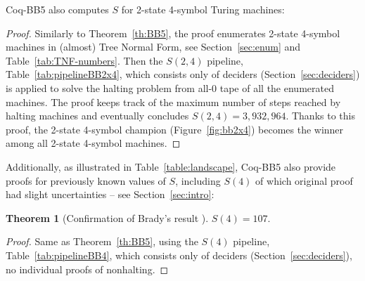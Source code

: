 \documentclass[a4paper,british]{article}
\theoremstyle{definition} %
\newtheorem{theorem}{Theorem}[section]
\numberwithin{equation}{section}
\theoremstyle{definition} %
\newcommand{\BBtheFourth}{107}
\newcommand{\BBTxF}{3{,}932{,}964}
\newcommand{\CoqBB}{Coq-BB5\xspace}
\begin{document}
\CoqBB also computes $S$ for 2-state 4-symbol Turing machines:

\thBBTxF*

\begin{proof}
    Similarly to Theorem~\ref{th:BB5}, the \Coq proof enumerates 2-state 4-symbol machines in (almost) Tree Normal Form, see Section~\ref{sec:enum} and Table~\ref{tab:TNF-numbers}. Then the $S(2,4)$ pipeline, Table~\ref{tab:pipelineBB2x4}, which consists only of deciders (Section~\ref{sec:deciders}) is applied to solve the halting problem from all-0 tape of all the enumerated machines. The proof keeps track of the maximum number of steps reached by halting machines and eventually concludes $S(2,4) = \BBTxF$. Thanks to this proof, the 2-state 4-symbol champion (Figure~\ref{fig:bb2x4}) becomes the winner among all 2-state 4-symbol machines.
\end{proof}

Additionally, as illustrated in Table~\ref{table:landscape}, \CoqBB also provide \Coq proofs for previously known values of $S$, including $S(4)$ of which original proof \cite{Brady83} had slight uncertainties -- see Section~\ref{sec:intro}:

\begin{theorem}[Confirmation of Brady's result \cite{Brady83}]\label{th:BB4}
    $S(4) = \BBtheFourth$.
\end{theorem}
\begin{proof}
    Same as Theorem~\ref{th:BB5}, using the $S(4)$ pipeline, Table~\ref{tab:pipelineBB4}, which consists only of deciders (Section~\ref{sec:deciders}), \ie no individual proofs of nonhalting.
\end{proof}

\newpage
\end{document}
